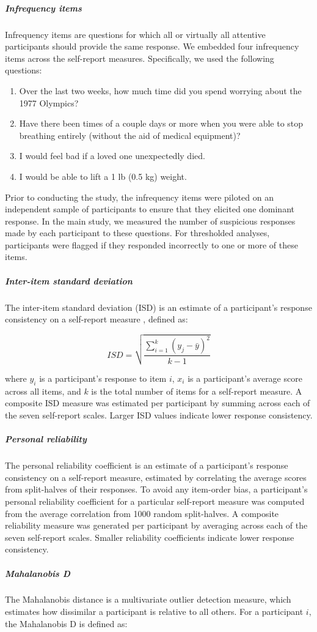 \documentclass[a4paper,notitlepage,12pt]{article}
\begin{document}
\subparagraph{Infrequency items} 

Infrequency items are questions for which all or virtually all attentive participants should provide the same response. We embedded four infrequency items across the self-report measures. Specifically, we used the following questions:

\begin{enumerate}
  \item Over the last two weeks, how much time did you spend worrying about the 1977 Olympics? 
  \item Have there been times of a couple days or more when you were able to stop breathing entirely (without the aid of medical equipment)?
  \item I would feel bad if a loved one unexpectedly died.
  \item I would be able to lift a 1 lb (0.5 kg) weight.
\end{enumerate}

Prior to conducting the study, the infrequency items were piloted on an independent sample of participants to ensure that they elicited one dominant response. In the main study, we measured the number of suspicious responses made by each participant to these questions. For thresholded analyses, participants were flagged if they responded incorrectly to one or more of these items.

\subparagraph{Inter-item standard deviation} The inter-item standard deviation (ISD) is an estimate of a participant's response consistency on a self-report measure \cite{marjanovic2015inter}, defined as:

\begin{equation*}
    ISD = \sqrt{\frac{\sum^k_{i=1}(y_j - \bar{y})^2}{k-1}}
\end{equation*}

where $y_i$ is a participant's response to item $i$, $x_i$ is a participant's average score across all  items, and $k$ is the total number of items for a self-report measure. A composite ISD measure was estimated per participant by summing across each of the seven self-report scales. Larger ISD values indicate lower response consistency.

\subparagraph{Personal reliability} 

The personal reliability coefficient is an estimate of a participant's response consistency on a self-report measure, estimated by correlating the average scores from split-halves of their responses. To avoid any item-order bias, a participant's personal reliability coefficient for a particular self-report measure was computed from the average correlation from 1000 random split-halves. A composite reliability measure was generated per participant by averaging across each of the seven self-report scales. Smaller reliability coefficients indicate lower response consistency.  
\subparagraph{Mahalanobis D} The Mahalanobis distance is a multivariate outlier detection measure, which estimates how dissimilar a participant is relative to all others. For a participant $i$, the Mahalanobis D is defined as:
\end{document}

